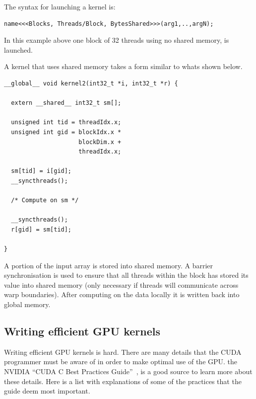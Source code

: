 \documentclass[a4paper]{book}
\begin{document}
The syntax for launching a kernel is:

\begin{small}
\begin{Verbatim}[samepage=true]
name<<<Blocks, Threads/Block, BytesShared>>>(arg1,..,argN);
\end{Verbatim}
\end{small}

\noindent In this example above one block of 32 threads using no shared memory, is launched. 

A kernel that uses shared memory takes a form similar to whats shown below. 

\begin{small}
\begin{Verbatim}[samepage=true]
__global__ void kernel2(int32_t *i, int32_t *r) {

  extern __shared__ int32_t sm[]; 

  unsigned int tid = threadIdx.x; 
  unsigned int gid = blockIdx.x * 
                     blockDim.x + 
                     threadIdx.x;

  sm[tid] = i[gid]; 
  __syncthreads();

  /* Compute on sm */ 
     
  __syncthreads();
  r[gid] = sm[tid]; 
  
}
\end{Verbatim} 
\end{small} 

\noindent A portion of the input array is stored into shared memory. A 
barrier synchronisation is used to ensure that all threads within the block 
has stored its value into shared memory (only necessary if threads will 
communicate across warp boundaries). After computing on the data locally 
it is written back into global memory. 


\subsection{Writing efficient GPU kernels} 

Writing efficient GPU kernels is hard. There are many details that the CUDA 
programmer must be aware of in order to make optimal use of the GPU. 
the NVIDIA ``CUDA C Best Practices Guide''~\citet{BestPrac}, is a good source 
to learn more about these details. Here is a list with explanations of some 
of the practices that the guide deem most important. 
\end{document}
